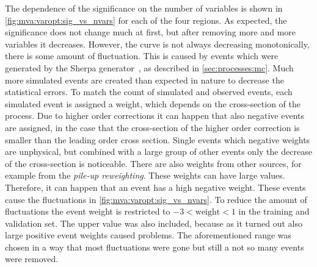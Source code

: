 The dependence of the significance on the number of variables is shown in \cref{fig:mva:varopt:sig_vs_nvars} for each of the four regions.
As expected, the significance does not change much at first, but after removing more and more variables it decreases.
However, the curve is not always decreasing monotonically, there is some amount of fluctuation.
This is caused by events which were generated by the Sherpa generator~\cite{Sherpa,Gleisberg:2008fv,Cascioli:2011va,Schumann:2007mg,Hoeche:2012yf},
as described in \cref{sec:processes:mc}.
Much more simulated events are created than expected in nature to decrease the statistical errors.
To match the count of simulated and observed events, each simulated event is assigned a weight, which depends on the cross-section of the process.
Due to higher order corrections it can happen that also negative events are assigned, in the case that the cross-section of the higher order
correction is smaller than the leading order cross section. Single events which negative weights are unphysical, but combined
with a large group of other events only the decrease of the cross-section is noticeable.
There are also weights from other sources, for example from the \emph{pile-up reweighting}. These weights can have large values.
Therefore, it can happen that an event has a high negative weight.
These events cause the fluctuations in \cref{fig:mva:varopt:sig_vs_nvars}.
To reduce the amount of fluctuations the event weight is restricted to $-3 < \text{weight} < 1$ in the training and validation set.
The upper value was also included, because as it turned out also large positive event weights caused problems.
The aforementioned range was chosen in a way that most fluctuations were gone but still a not so many events were removed.

